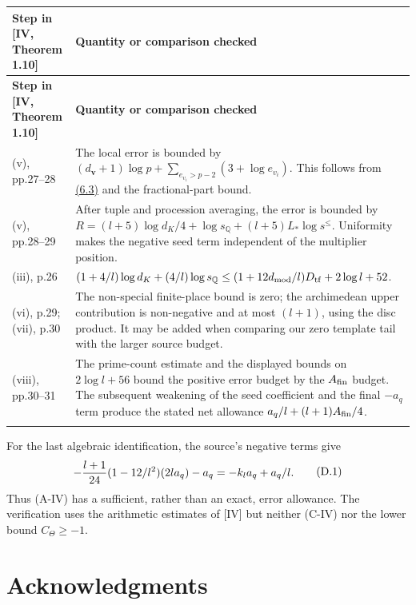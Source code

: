 \documentclass[11pt,a4paper]{amsart}
\begin{document}
\Needspace{130pt}
{\footnotesize
\setlength{\tabcolsep}{4pt}
\begin{longtable}{@{}P{0.23\textwidth}P{0.72\textwidth}@{}}
\toprule
\textbf{Step in [IV, Theorem 1.10]} & \textbf{Quantity or comparison checked}\\\midrule
\endfirsthead
\toprule
\textbf{Step in [IV, Theorem 1.10]} & \textbf{Quantity or comparison checked}\\\midrule
\endhead
\bottomrule\endfoot
(v), pp.27--28 & The local error is bounded by $(d_{\mathbf v}+1)\log p+\sum_{e_{v_i}>p-2}(3+\log e_{v_i})$. This follows from \hyperref[eq:6.3]{(6.3)} and the fractional-part bound.\\\addlinespace[3pt]
(v), pp.28--29 & After tuple and procession averaging, the error is bounded by $R=(l+5)\log d_K/4+\log s_{\mathbb Q}+(l+5)L_*\log s^{\le}$. Uniformity makes the negative seed term independent of the multiplier position.\\\addlinespace[3pt]
(iii), p.26 & $(1+4/l)\log d_K+(4/l)\log s_{\mathbb Q}\le(1+12d_{\rm mod}/l)D_{\rm tf}+2\log l+52$.\\\addlinespace[3pt]
(vi), p.29; (vii), p.30 & The non-special finite-place bound is zero; the archimedean upper contribution is non-negative and at most $(l+1)$, using the disc product. It may be added when comparing our zero template tail with the larger source budget.\\\addlinespace[3pt]
(viii), pp.30--31 & The prime-count estimate and the displayed bounds on $2\log l+56$ bound the positive error budget by the $A_{\rm fin}$ budget. The subsequent weakening of the seed coefficient and the final $-a_q$ term produce the stated net allowance $a_q/l+(l+1)A_{\rm fin}/4$.\\\addlinespace[3pt]
\end{longtable}
}

For the last algebraic identification, the source's negative terms give
\begin{equation}
\begin{gathered}
-{l+1\over24}(1-12/l^2)(2la_q)-a_q
=-k_la_q+a_q/l.
\end{gathered}
\tag{D.1}\label{eq:D.1}
\end{equation}
Thus (A-IV) has a sufficient, rather than an exact, error allowance. The verification uses the arithmetic estimates of [IV] but neither (C-IV) nor the lower bound $C_\Theta\ge-1$.


\section*{Acknowledgments}
\end{document}
